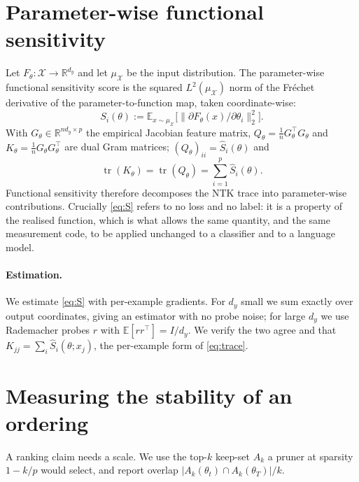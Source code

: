\documentclass{article}
\begin{document}
\section{Parameter-wise functional sensitivity}
\label{sec:sensitivity}
Let $F_\theta:\mathcal X\to\mathbb R^{d_y}$ and let $\mu_{\mathcal X}$ be the input
distribution. The parameter-wise functional sensitivity score is the squared
$L^2(\mu_{\mathcal X})$ norm of the Fr\'echet derivative of the parameter-to-function map,
taken coordinate-wise:
\begin{equation}
  S_i(\theta):=\mathbb E_{x\sim\mu_{\mathcal X}}
  \big[\|\partial F_\theta(x)/\partial\theta_i\|_2^2\big].
  \label{eq:S}
\end{equation}
With $G_\theta\in\mathbb R^{nd_y\times p}$ the empirical Jacobian feature matrix,
$Q_\theta=\frac1n G_\theta^\top G_\theta$ and $K_\theta=\frac1n G_\theta G_\theta^\top$ are
dual Gram matrices; $(Q_\theta)_{ii}=\widehat S_i(\theta)$ and
\begin{equation}
  \operatorname{tr}(K_\theta)=\operatorname{tr}(Q_\theta)=\sum_{i=1}^p\widehat S_i(\theta).
  \label{eq:trace}
\end{equation}
Functional sensitivity therefore decomposes the NTK trace into parameter-wise
contributions. Crucially \eqref{eq:S} refers to no loss and no label: it is a property of
the realised function, which is what allows the same quantity, and the same measurement
code, to be applied unchanged to a classifier and to a language model.

\paragraph{Estimation.}
We estimate \eqref{eq:S} with per-example gradients. For $d_y$ small we sum exactly over
output coordinates, giving an estimator with no probe noise; for large $d_y$ we use
Rademacher probes $r$ with $\mathbb E[rr^\top]=I/d_y$. We verify the two agree and that
$K_{jj}=\sum_i \widehat S_i(\theta;x_j)$, the per-example form of \eqref{eq:trace}.

\section{Measuring the stability of an ordering}
\label{sec:protocol}
A ranking claim needs a scale. We use the top-$k$ keep-set $A_k$ a pruner at sparsity
$1-k/p$ would select, and report overlap $|A_k(\theta_t)\cap A_k(\theta_T)|/k$.
\end{document}
